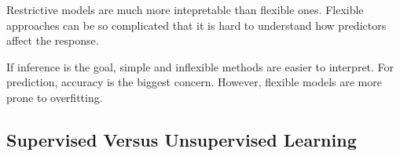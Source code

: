 \documentclass[]{book}
\theoremstyle{definition}
\theoremstyle{definition}
\theoremstyle{definition}
\theoremstyle{remark}
\begin{document}
Restrictive models are much more intepretable than flexible ones.
Flexible approaches can be so complicated that it is hard to understand
how predictors affect the response.

If inference is the goal, simple and inflexible methods are easier to
interpret. For prediction, accuracy is the biggest concern. However,
flexible models are more prone to overfitting.

\subsection{Supervised Versus Unsupervised
Learning}\label{supervised-versus-unsupervised-learning}
\end{document}
